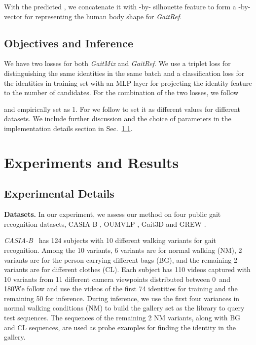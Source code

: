 \documentclass[10pt,twocolumn,letterpaper]{article}
\begin{document}
With the predicted , we concatenate it with -by- silhouette feature  to form a -by- vector for representing the human body shape for \textit{GaitRef}. 


\subsection{Objectives and Inference}\label{sec:obj}
We have two losses for both \textit{GaitMix} and \textit{GaitRef}. We use a triplet loss  for distinguishing the same identities in the same batch and a classification loss  for the identities in training set with an MLP layer for projecting the identity feature to the number of candidates. For the combination of the two losses, we follow


and empirically set  as 1. For  we follow \cite{lin2021gaitgl,zheng2022gait} to set it as different values for different datasets. We include further discussion and the choice of parameters in the implementation details section in Sec.~\ref{sec:exp}.

 \section{Experiments and Results}



\subsection{Experimental Details}\label{sec:exp}

\textbf{Datasets.} In our experiment, we assess our method on four public gait recognition datasets, CASIA-B \cite{yu2006framework}, OUMVLP \cite{he2018multi,an2020performance}, Gait3D \cite{zheng2022gait} and GREW \cite{zhu2021gait}. 

\textit{CASIA-B}~\cite{yu2006framework} has 124 subjects with 10 different walking variants for gait recognition. Among the 10 variants, 6 variants are for normal walking (NM), 2 variants are for the person carrying different bags (BG), and the remaining 2 variants are for different clothes (CL). 
Each subject has 110 videos captured with 10 variants from 11 different camera viewpoints distributed between 0\degree\ and 180\degree\. 
We follow \cite{chao2019gaitset,fan2020gaitpart,hou2020gln,lin2021gaitgl} and use the videos of the first 74 identities for training and the remaining 50 for inference. 
During inference, we use the first four variances in normal walking conditions (NM) to build the gallery set as the library to query test sequences.
The sequences of the remaining 2 NM variants, along with BG and CL sequences, are used as probe examples for finding the identity in the gallery.
\end{document}

